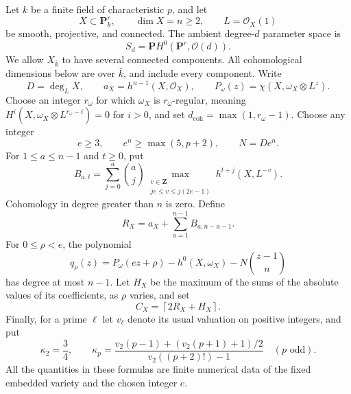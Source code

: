 \documentclass[11pt]{article}
\theoremstyle{remark}\newtheorem{remark}[theorem]{Remark}
\newcommand{\OO}{\mathcal O}
\newcommand{\PP}{\mathbf P}
\newcommand{\ZZ}{\mathbf Z}
\begin{document}
Let $k$ be a finite field of characteristic $p$, and let
\[
 X\subset\PP^r_k,\qquad \dim X=n\ge2,
 \qquad L=\OO_X(1)
\]
be smooth, projective, and connected. The ambient degree-$d$ parameter space is
\[ S_d=\PP H^0(\PP^r,\OO(d)). \]
We allow $X_{\bar k}$ to have several connected components. All cohomological dimensions below are over $\bar k$, and include every component. Write
\[
 D=\deg_LX,\qquad a_X=h^{n-1}(X,\OO_X),\qquad
 P_\omega(z)=\chi(X,\omega_X\otimes L^z).
\]
Choose an integer $r_\omega$ for which $\omega_X$ is $r_\omega$-regular, meaning
$H^i(X,\omega_X\otimes L^{r_\omega-i})=0$ for $i>0$, and set
$d_{\mathrm{coh}}=\max(1,r_\omega-1)$. Choose any integer
\begin{equation}\label{eq:e}
 e\ge3,\qquad e^n\ge\max(5,p+2),\qquad N=De^n.
\end{equation}
For $1\le a\le n-1$ and $t\ge0$, put
\begin{equation}\label{eq:B}
 B_{a,t}=\sum_{j=0}^a\binom aj
 \max_{\substack{v\in\ZZ\\je\le v\le j(2e-1)}}
 h^{t+j}(X,L^{-v}).
\end{equation}
Cohomology in degree greater than $n$ is zero. Define
\begin{equation}\label{eq:R}
 R_X=a_X+\sum_{a=1}^{n-1}B_{a,n-a-1}.
\end{equation}
For $0\le\rho<e$, the polynomial
\begin{equation}\label{eq:q}
 q_\rho(z)=P_\omega(ez+\rho)-h^0(X,\omega_X)
                         -N\binom{z-1}{n}
\end{equation}
has degree at most $n-1$. Let $H_X$ be the maximum of the sums of the absolute values of its coefficients, as $\rho$ varies, and set
\begin{equation}\label{eq:C}
 C_X=\left\lceil2R_X+H_X\right\rceil.
\end{equation}
Finally, for a prime $\ell$ let $v_\ell$ denote its usual valuation on positive integers, and put
\begin{equation}\label{eq:kappa}
 \kappa_2=\frac34,\qquad
 \kappa_p=
 \frac{v_2(p-1)+(v_2(p+1)+1)/2}{v_2((p+2)!)-1}\quad(p\text{ odd}).
\end{equation}
All the quantities in these formulas are finite numerical data of the fixed embedded variety and the chosen integer $e$.
\end{document}
